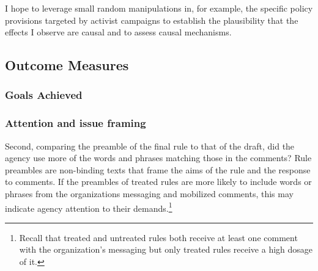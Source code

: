 

I hope to leverage small random manipulations in, for example, the specific policy provisions targeted by activist campaigns to establish the plausibility that the effects I observe are causal and to assess causal mechanisms. 

\subsection{Outcome Measures}

\subsubsection{Goals Achieved}


\subsubsection{Attention and issue framing}

Second, comparing the preamble of the final rule to that of the draft, did the agency use more of the words and phrases matching those in the comments? Rule preambles are non-binding texts that frame the aims of the rule and the response to comments.  If the preambles of treated rules are more likely to include words or phrases from the organizations messaging and mobilized comments, this may indicate agency attention to their demands.\footnote{Recall that  treated and untreated rules both receive at least one comment with the organization's messaging but only treated rules receive a high dosage of it.}

